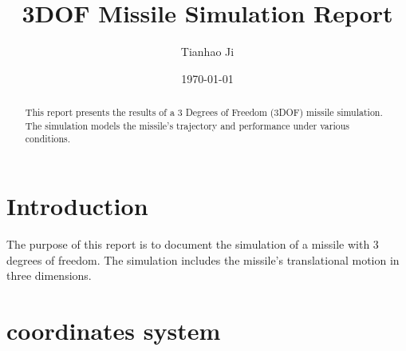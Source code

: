 \documentclass{article}
\title{3DOF Missile Simulation Report}
\author{Tianhao Ji}
\date{\today}
\begin{document}
\maketitle

\begin{abstract}
This report presents the results of a 3 Degrees of Freedom (3DOF) missile simulation. The simulation models the missile's trajectory and performance under various conditions.
\end{abstract}

\newpage
\tableofcontents 

\newpage

\section{Introduction}
The purpose of this report is to document the simulation of a missile with 3 degrees of freedom. The simulation includes the missile's translational motion in three dimensions.

\newpage
\section{coordinates system}
\end{document}
